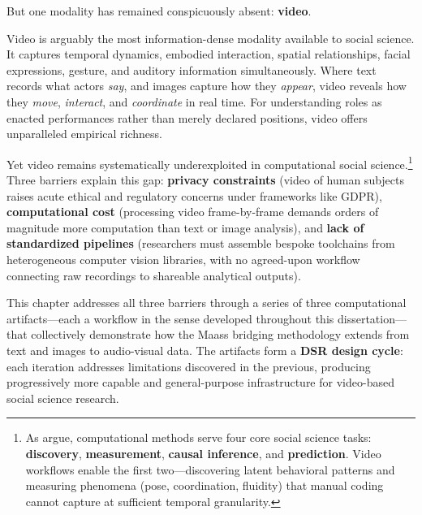 \documentclass[../main.tex]{subfiles}
\begin{document}
But one modality has remained conspicuously absent: \textbf{video}.

Video is arguably the most information-dense modality available to social science. It captures temporal dynamics, embodied interaction, spatial relationships, facial expressions, gesture, and auditory information simultaneously. Where text records what actors \emph{say}, and images capture how they \emph{appear}, video reveals how they \emph{move}, \emph{interact}, and \emph{coordinate} in real time. For understanding roles as enacted performances rather than merely declared positions, video offers unparalleled empirical richness.

Yet video remains systematically underexploited in computational social science.\footnote{As \textcite{grimmer2021machine} argue, computational methods serve four core social science tasks: \textbf{discovery}, \textbf{measurement}, \textbf{causal inference}, and \textbf{prediction}. Video workflows enable the first two---discovering latent behavioral patterns and measuring phenomena (pose, coordination, fluidity) that manual coding cannot capture at sufficient temporal granularity.} Three barriers explain this gap: \textbf{privacy constraints} (video of human subjects raises acute ethical and regulatory concerns under frameworks like GDPR), \textbf{computational cost} (processing video frame-by-frame demands orders of magnitude more computation than text or image analysis), and \textbf{lack of standardized pipelines} (researchers must assemble bespoke toolchains from heterogeneous computer vision libraries, with no agreed-upon workflow connecting raw recordings to shareable analytical outputs).

This chapter addresses all three barriers through a series of three computational artifacts---each a workflow in the sense developed throughout this dissertation---that collectively demonstrate how the Maass bridging methodology extends from text and images to audio-visual data. The artifacts form a \textbf{DSR design cycle}: each iteration addresses limitations discovered in the previous, producing progressively more capable and general-purpose infrastructure for video-based social science research.
\end{document}
